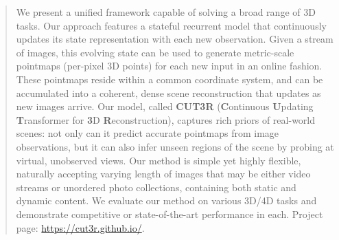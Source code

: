 \vspace{-1em}\begin{abstract}
We present a unified framework capable of solving a broad range of 3D tasks.
Our approach features a stateful recurrent model that continuously updates its state representation with each new observation. Given a stream of images, this evolving state can be used to generate metric-scale pointmaps (per-pixel 3D points) for each new input in an online fashion. These pointmaps reside within a common coordinate system, and can be accumulated into a coherent, dense scene reconstruction that updates as new images arrive.
Our model, called \textbf{CUT3R} (\textbf{C}ontinuous \textbf{U}pdating \textbf{T}ransformer for \textbf{3}D \textbf{R}econstruction), captures rich priors of real-world scenes: not only can it predict accurate pointmaps from image observations,
but it can also infer unseen regions of the scene by probing at virtual, unobserved views.
Our method is simple yet highly flexible, naturally accepting varying length of images that may be either video streams or unordered photo collections, containing both static and dynamic content. We evaluate our method on various 3D/4D tasks and demonstrate competitive or state-of-the-art performance in each. 
Project page: \url{https://cut3r.github.io/}.



\end{abstract}